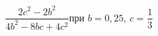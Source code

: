 \begin{ex}[type=expr_calc]
	\begin{condition}
		\( \dfrac{2c^2-2b^2}{4b^2-8bc+4c^2} \)\hspace{0.5cm}при \( b=0,25 \), \( c=\dfrac{1}{3} \)
	\end{condition}
\end{ex}